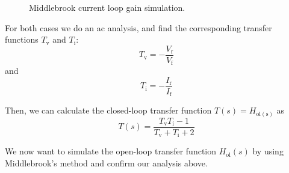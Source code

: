 \documentclass[
  a4paper,
  DIV=11,
  numbers=noendperiod]{scrartcl}
\begin{document}
\begin{figure}[H]


\caption{\label{fig-middlebrook-current}Middlebrook current loop gain
simulation.}

\end{figure}%

For both cases we do an ac analysis, and find the corresponding transfer
functions \(T_\mathrm{v}\) and \(T_\mathrm{i}\): \[
T_\mathrm{v} = -\frac{V_\mathrm{r}}{V_\mathrm{f}}
\] and \[
T_\mathrm{i} = -\frac{I_\mathrm{r}}{I_\mathrm{f}}
\]

Then, we can calculate the closed-loop transfer function
\(T(s) = H_\mathrm{ol(s)}\) as \[
T(s) = \frac{T_\mathrm{v} T_\mathrm{i} - 1}{T_\mathrm{v} + T_\mathrm{i} + 2}
\]

We now want to simulate the open-loop transfer function
\(H_\mathrm{ol}(s)\) by using Middlebrook's method and confirm our
analysis above.
\end{document}
